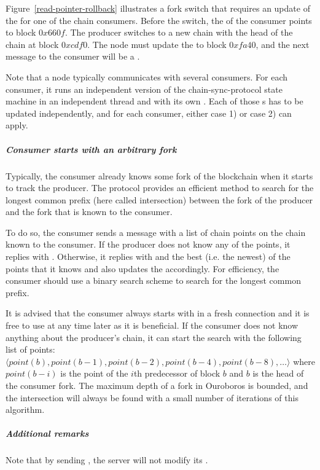 Figure~\ref{read-pointer-rollback} illustrates a fork switch that requires an update of the \readpointer{}
for one of the chain consumers.
Before the switch, the \readpointer{} of the consumer points to block $0x660f$.
The producer switches to a new chain with the head of the chain at block $0xcdf0$.
The node must update the \readpointer{} to block $0xfa40$, and the next message to the consumer
will be a \MsgRollBackward.

Note that a node typically communicates with several consumers. For each consumer, it runs an independent
version of the chain-sync-protocol state machine in an independent thread and with its own \readpointer{}.
Each of those \readpointer{}s has to be updated independently, and for each consumer,
either case 1) or case 2) can apply.

\subparagraph{Consumer starts with an arbitrary fork}
Typically, the consumer already knows some fork of the blockchain when it
starts to track the producer.
The protocol provides an efficient method to search for the longest common prefix (here called intersection)
between the fork of the producer and the fork that is known to the consumer.

To do so, the consumer sends a \MsgFindIntersect{} message with a list of chain
points on the chain known to the consumer.
If the producer does not know any of the points, it replies with \MsgIntersectNotFound.
Otherwise, it replies with \MsgIntersectFound{} and the best (i.e. the newest) of the points that it knows
and also updates the \readpointer{} accordingly.
For efficiency, the consumer should use a binary search scheme to search for the longest common
prefix.

It is advised that the consumer always starts with \MsgFindIntersect{} in a fresh connection
and it is free to use \MsgFindIntersect{} at any time later as it is beneficial.
If the consumer does not know anything about the producer's chain,
it can start the search with the following list of points:
$\langle point(b), point(b-1), point(b-2), point(b-4), point (b-8),\ldots \rangle$
where $point(b-i)$ is the point of the $i$th predecessor of block $b$ and
$b$ is the head of the consumer fork.
The maximum depth of a fork in Ouroboros is bounded, and the intersection will always be found with a small number of
iterations of this algorithm.

\subparagraph{Additional remarks}
Note that by sending \MsgIntersectNotFound{}, the server will not modify its
\readpointer{}.

